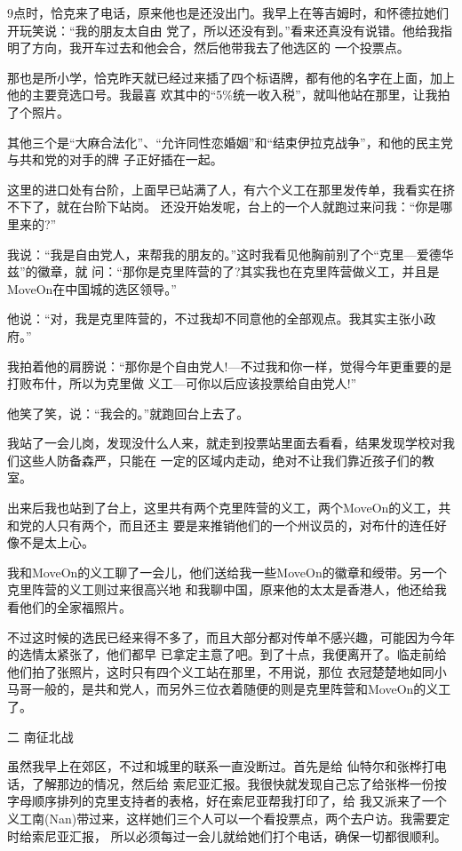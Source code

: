 ﻿\documentclass[11pt]{article}
\begin{document}
9点时，恰克来了电话，原来他也是还没出门。我早上在等吉姆时，和怀德拉她们开玩笑说：``我的朋友太自由
党了，所以还没有到。''看来还真没有说错。他给我指明了方向，我开车过去和他会合，然后他带我去了他选区的
一个投票点。

那也是所小学，恰克昨天就已经过来插了四个标语牌，都有他的名字在上面，加上他的主要竞选口号。我最喜
欢其中的``5\%统一收入税''，就叫他站在那里，让我拍了个照片。

其他三个是``大麻合法化''、``允许同性恋婚姻''和``结束伊拉克战争''，和他的民主党与共和党的对手的牌
子正好插在一起。

这里的进口处有台阶，上面早已站满了人，有六个义工在那里发传单，我看实在挤不下了，就在台阶下站岗。
还没开始发呢，台上的一个人就跑过来问我：``你是哪里来的?''

我说：``我是自由党人，来帮我的朋友的。''这时我看见他胸前别了个``克里---爱德华兹''的徽章，就
问：``那你是克里阵营的了?其实我也在克里阵营做义工，并且是MoveOn在中国城的选区领导。''

他说：``对，我是克里阵营的，不过我却不同意他的全部观点。我其实主张小政府。''

我拍着他的肩膀说：``那你是个自由党人!---不过我和你一样，觉得今年更重要的是打败布什，所以为克里做
义工---可你以后应该投票给自由党人!''

他笑了笑，说：``我会的。''就跑回台上去了。

我站了一会儿岗，发现没什么人来，就走到投票站里面去看看，结果发现学校对我们这些人防备森严，只能在
一定的区域内走动，绝对不让我们靠近孩子们的教室。

出来后我也站到了台上，这里共有两个克里阵营的义工，两个MoveOn的义工，共和党的人只有两个，而且还主
要是来推销他们的一个州议员的，对布什的连任好像不是太上心。

我和MoveOn的义工聊了一会儿，他们送给我一些MoveOn的徽章和绶带。另一个克里阵营的义工则过来很高兴地
和我聊中国，原来他的太太是香港人，他还给我看他们的全家福照片。

不过这时候的选民已经来得不多了，而且大部分都对传单不感兴趣，可能因为今年的选情太紧张了，他们都早
已拿定主意了吧。到了十点，我便离开了。临走前给他们拍了张照片，这时只有四个义工站在那里，不用说，那位
衣冠楚楚地如同小马哥一般的，是共和党人，而另外三位衣着随便的则是克里阵营和MoveOn的义工了。

二 南征北战

虽然我早上在郊区，不过和城里的联系一直没断过。首先是给 仙特尔和张桦打电话，了解那边的情况，然后给
索尼亚汇报。我很快就发现自己忘了给张桦一份按字母顺序排列的克里支持者的表格，好在索尼亚帮我打印了，给
我又派来了一个义工南(Nan)带过来，这样她们三个人可以一个看投票点，两个去户访。我需要定时给索尼亚汇报，
所以必须每过一会儿就给她们打个电话，确保一切都很顺利。
\end{document}
